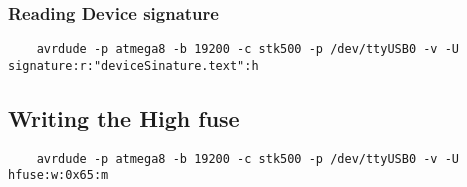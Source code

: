 \documentclass{article}
\begin{document}
\subsubsection{Reading Device signature}
\begin{verbatim}
    avrdude -p atmega8 -b 19200 -c stk500 -p /dev/ttyUSB0 -v -U signature:r:"deviceSinature.text":h
\end{verbatim}


\subsection{Writing the High fuse}
\begin{verbatim}
    avrdude -p atmega8 -b 19200 -c stk500 -p /dev/ttyUSB0 -v -U hfuse:w:0x65:m
\end{verbatim}
\end{document}
